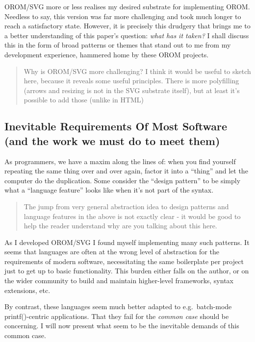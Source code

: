 \documentclass[english,submission]{programming}
\begin{document}
OROM/SVG more or less realises my desired substrate for implementing
OROM. Needless to say, this version was far more challenging and took
much longer to reach a satisfactory state. However, it is precisely this
drudgery that brings me to a better understanding of this paper's
question: \emph{what has it taken?} I shall discuss this in the form of
broad patterns or themes that stand out to me from my development
experience, hammered home by these OROM projects.

\begin{quote}
Why is OROM/SVG more challenging? I think it would be useful to sketch
here, because it reveals some useful principles. There is more
polyfilling (arrows and resizing is not in the SVG substrate itself),
but at least it's possible to add those (unlike in HTML)
\end{quote}

\hypertarget{inevitable-requirements-of-most-software-and-the-work-we-must-do-to-meet-them}{%
\subsection{Inevitable Requirements Of Most Software (and the work we
must do to meet
them)}\label{inevitable-requirements-of-most-software-and-the-work-we-must-do-to-meet-them}}

As programmers, we have a maxim along the lines of: when you find
yourself repeating the same thing over and over again, factor it into a
``thing'' and let the computer do the duplication. Some consider the
``design pattern'' to be simply what a ``language feature'' looks like
when it's not part of the syntax.

\begin{quote}
The jump from very general abstraction idea to design patterns and
language features in the above is not exactly clear - it would be good
to help the reader understand why are you talking about this here.
\end{quote}

As I developed OROM/SVG I found myself implementing many such patterns.
It seems that languages are often at the wrong level of abstraction for
the requirements of modern software, necessitating the same boilerplate
per project just to get up to basic functionality. This burden either
falls on the author, or on the wider community to build and maintain
higher-level frameworks, syntax extensions, etc.

By contrast, these languages seem much better adapted to e.g.~batch-mode
printf()-centric applications. That they fail for the \emph{common case}
should be concerning. I will now present what seem to be the inevitable
demands of this common case.
\end{document}
